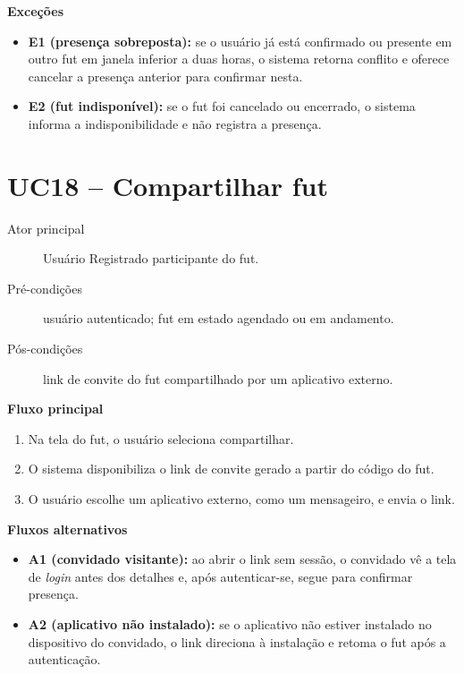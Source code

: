 \begin{apendicesenv}
        \noindent\textbf{Exceções}
        \begin{itemize}
            \item \textbf{E1 (presença sobreposta):} se o usuário já está confirmado ou presente em outro fut em janela inferior a duas horas, o sistema retorna conflito e oferece cancelar a presença anterior para confirmar nesta.
            \item \textbf{E2 (fut indisponível):} se o fut foi cancelado ou encerrado, o sistema informa a indisponibilidade e não registra a presença.
        \end{itemize}

    \section*{UC18 -- Compartilhar fut}
        \begin{description}
            \item[Ator principal] Usuário Registrado participante do fut.
            \item[Pré-condições] usuário autenticado; fut em estado agendado ou em andamento.
            \item[Pós-condições] link de convite do fut compartilhado por um aplicativo externo.
        \end{description}

        \noindent\textbf{Fluxo principal}
        \begin{enumerate}
            \item Na tela do fut, o usuário seleciona compartilhar.
            \item O sistema disponibiliza o link de convite gerado a partir do código do fut.
            \item O usuário escolhe um aplicativo externo, como um mensageiro, e envia o link.
        \end{enumerate}

        \noindent\textbf{Fluxos alternativos}
        \begin{itemize}
            \item \textbf{A1 (convidado visitante):} ao abrir o link sem sessão, o convidado vê a tela de \textit{login} antes dos detalhes e, após autenticar-se, segue para confirmar presença.
            \item \textbf{A2 (aplicativo não instalado):} se o aplicativo não estiver instalado no dispositivo do convidado, o link direciona à instalação e retoma o fut após a autenticação.
        \end{itemize}


\end{apendicesenv}
